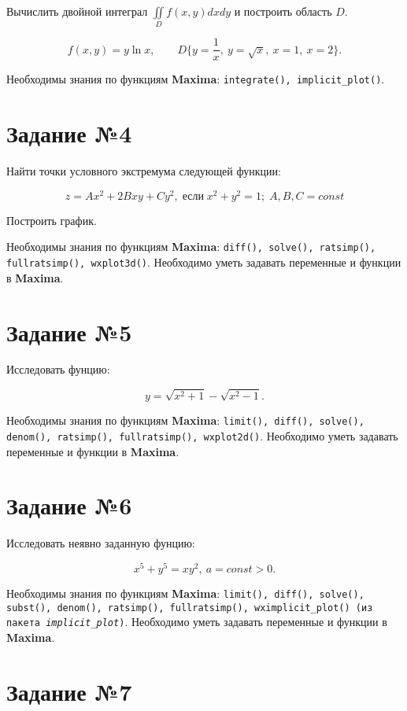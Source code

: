     Вычислить двойной интеграл $\iint\limits_{D} f(x,y) dx dy$ и построить область $D$.

    \[
        f(x,y) = y \ln{x}, \qquad D \{ y = \frac{1}{x}, \: y = \sqrt{x}, \: x = 1, \: x = 2 \}.
    \]

    Необходимы знания по функциям \textbf{Maxima}: {\tt integrate(), implicit\_plot()}.

\section*{Задание №4}

    Найти точки условного экстремума следующей функции:

    \[
        z = A x^{2} + 2 B x y + C y^{2}, \; \mbox{если} \; x^{2} + y^{2} = 1; \; A,B,C = const
    \]

    Построить график.

    Необходимы знания по функциям \textbf{Maxima}: {\tt diff(), solve(), ratsimp(), fullratsimp(), wxplot3d()}. Необходимо уметь задавать переменные и функции в \textbf{Maxima}.

\section*{Задание №5}

    Исследовать фунцию:

    \[
        y = \sqrt{x^{2} + 1} - \sqrt{x^2 - 1}.
    \]

    Необходимы знания по функциям \textbf{Maxima}: {\tt limit(), diff(), solve(), denom(), ratsimp(), fullratsimp(), wxplot2d()}. Необходимо уметь задавать переменные и функции в \textbf{Maxima}.

\section*{Задание №6}

    Исследовать неявно заданную фунцию:

    \[
        x^{5} + y^{5} = x y^{2}, \: a = const > 0.
    \]

    Необходимы знания по функциям \textbf{Maxima}: {\tt limit(), diff(), solve(), subst(), denom(), ratsimp(), fullratsimp(), wximplicit\_plot() (из пакета \textit{implicit\_plot})}. Необходимо уметь задавать переменные и функции в \textbf{Maxima}.

\section*{Задание №7}


